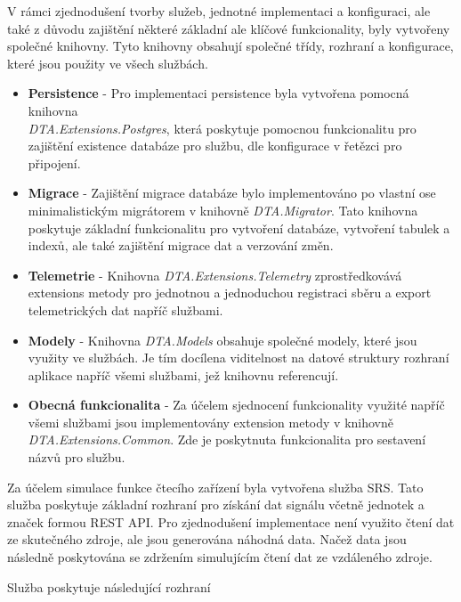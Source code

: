 
V rámci zjednodušení tvorby služeb, jednotné implementaci a konfiguraci, ale také z důvodu zajištění některé základní ale klíčové funkcionality, byly vytvořeny společné knihovny. Tyto knihovny obsahují společné třídy, rozhraní a konfigurace, které jsou použity ve všech službách.

\begin{itemize}
  \item \textbf{Persistence} - Pro implementaci persistence byla vytvořena pomocná knihovna \\ \emph{DTA.Extensions.Postgres}, která poskytuje pomocnou funkcionalitu pro zajištění existence databáze pro službu, dle konfigurace v řetězci pro připojení.
  \item \textbf{Migrace} - Zajištění migrace databáze bylo implementováno po vlastní ose minimalistickým migrátorem v knihovně \emph{DTA.Migrator}. Tato knihovna poskytuje základní funkcionalitu pro vytvoření databáze, vytvoření tabulek a indexů, ale také zajištění migrace dat a verzování změn.
  \item \textbf{Telemetrie} - Knihovna \emph{DTA.Extensions.Telemetry} zprostředkovává extensions metody pro jednotnou a jednoduchou registraci sběru a export telemetrických dat napříč službami.
  \item \textbf{Modely} - Knihovna \emph{DTA.Models} obsahuje společné modely, které jsou využity ve službách. Je tím docílena viditelnost na datové struktury rozhraní aplikace napříč všemi službami, jež knihovnu referencují.
  \item \textbf{Obecná funkcionalita} - Za účelem sjednocení funkcionality využité napříč všemi službami jsou implementovány extension metody v knihovně \\ \emph{DTA.Extensions.Common}. Zde je poskytnuta funkcionalita pro sestavení názvů pro službu.
\end{itemize}


Za účelem simulace funkce čtecího zařízení byla vytvořena služba SRS. Tato služba poskytuje základní rozhraní pro získání dat signálu včetně jednotek a značek formou REST API. Pro zjednodušení implementace není využito čtení dat ze skutečného zdroje, ale jsou generována náhodná data. Načež data jsou následně poskytována se zdržením simulujícím čtení dat ze vzdáleného zdroje.

Služba poskytuje následující rozhraní

